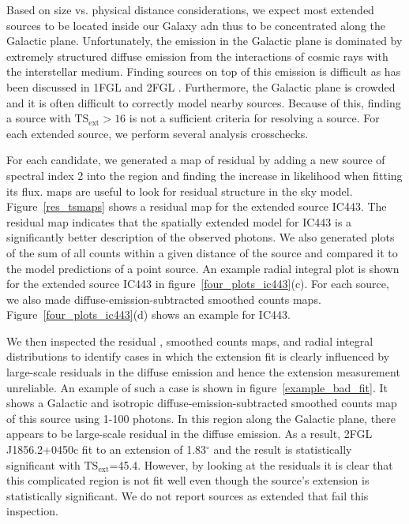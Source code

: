 \documentclass[12pt,preprint]{aastex}
\newcommand{\gev}{\text{GeV}\xspace}
\newcommand{\tsext}{{\ensuremath{\text{TS}_{\text{ext}}}}\xspace}
\newcommand{\ts}{\text{TS}\xspace}
\renewcommand{\deg}{\ensuremath{^\circ}\xspace}
\begin{document}
Based on size vs. physical distance considerations,
we expect most extended sources to be located inside our Galaxy
adn thus to be concentrated along the Galactic plane.  Unfortunately, the \gev emission
in the Galactic plane is dominated by extremely structured 
diffuse emission from the interactions of cosmic rays with the
interstellar medium.  Finding sources on top of this emission is difficult
\citep{first_diffuse_paper} as has been discussed in 1FGL and 2FGL
\citep{first_cat,second_cat}.  Furthermore, the Galactic plane is crowded
and it is often difficult to correctly model nearby sources.  Because of this,
finding a source with $\tsext>16$ is not a sufficient
criteria for resolving a source. For each extended source,
we perform several analysis crosschecks.

For each candidate, we generated a map of residual \ts by adding a new
source of spectral index 2 into the region and finding the increase in
likelihood when fitting its flux. \ts maps are useful to look for residual
structure in the sky model.  Figure~\ref{res_tsmaps} shows a residual \ts
map for the extended source IC443.  The residual \ts map indicates that
the spatially extended model for IC443 is a significantly better description
of the observed photons.
We also generated plots of the sum of
all counts within a given distance of the source and compared it to the
model predictions of a point source.  
An example radial integral plot is shown for the extended source IC443
in figure~\ref{four_plots_ic443}(c).  For each source, we also made
diffuse-emission-subtracted smoothed counts
maps. Figure~\ref{four_plots_ic443}(d) shows an example for IC443.

We then inspected the residual \ts, smoothed counts maps, and radial
integral distributions to identify cases in which the extension fit
is clearly influenced by large-scale residuals in the diffuse emission
and hence the extension measurement unreliable.  An example of such a
case is shown in figure~\ref{example_bad_fit}. It shows a Galactic and
isotropic diffuse-emission-subtracted smoothed counts map of this source
using 1-100 \gev photons.  In this region along the Galactic plane,
there appears to be large-scale residual in the diffuse emission. As
a result, 2FGL\,J1856.2+0450c fit to an extension of 1.83\deg and the
result is statistically significant with \tsext=45.4. However, by looking at
the residuals it is clear that this complicated region is not fit well
even though the source's extension is statistically significant. We do
not report sources as extended that fail this inspection.
\end{document}
